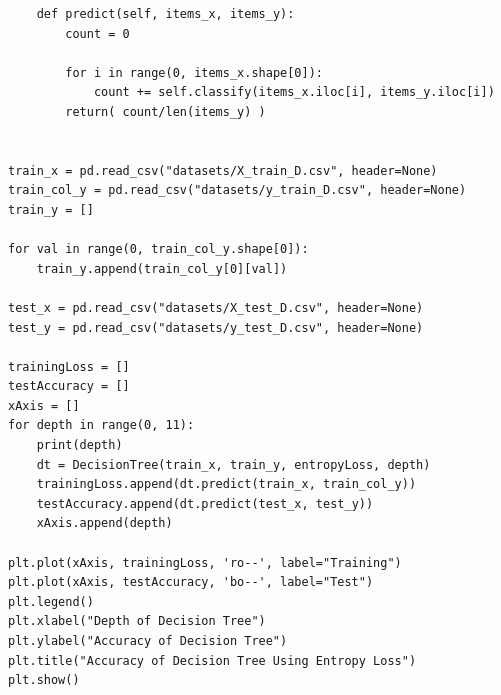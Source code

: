 \documentclass{article}
\begin{document}
\begin{titlepage}
\begin{lstlisting}
    def predict(self, items_x, items_y):
        count = 0

        for i in range(0, items_x.shape[0]):
            count += self.classify(items_x.iloc[i], items_y.iloc[i])
        return( count/len(items_y) )


train_x = pd.read_csv("datasets/X_train_D.csv", header=None)
train_col_y = pd.read_csv("datasets/y_train_D.csv", header=None)
train_y = []

for val in range(0, train_col_y.shape[0]):
    train_y.append(train_col_y[0][val])

test_x = pd.read_csv("datasets/X_test_D.csv", header=None)
test_y = pd.read_csv("datasets/y_test_D.csv", header=None)

trainingLoss = []
testAccuracy = []
xAxis = []
for depth in range(0, 11):
    print(depth)
    dt = DecisionTree(train_x, train_y, entropyLoss, depth)
    trainingLoss.append(dt.predict(train_x, train_col_y))
    testAccuracy.append(dt.predict(test_x, test_y))
    xAxis.append(depth)

plt.plot(xAxis, trainingLoss, 'ro--', label="Training")
plt.plot(xAxis, testAccuracy, 'bo--', label="Test")
plt.legend()
plt.xlabel("Depth of Decision Tree")
plt.ylabel("Accuracy of Decision Tree")
plt.title("Accuracy of Decision Tree Using Entropy Loss")
plt.show()
\end{lstlisting}
\end{titlepage}
\end{document}
